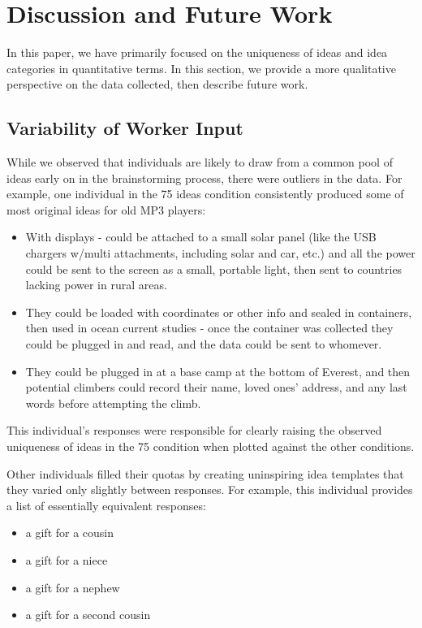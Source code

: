 \section{Discussion and Future Work}

In this paper, we have primarily focused on the uniqueness of ideas and idea categories in quantitative terms. In this section, we provide a more qualitative perspective on the data collected, then describe future work.

\subsection{Variability of Worker Input}
While we observed that individuals are likely to draw from a common pool of ideas early on in the brainstorming process, there were outliers in the data. For example, one individual in the 75 ideas condition consistently produced some of most original ideas for old MP3 players:

\begin{itemize}
\item With displays - could be attached to a small solar panel (like the USB chargers w/multi attachments, including solar and car, etc.) and all the power could be sent to the screen as a small, portable light, then sent to countries lacking power in rural areas.
\item They could be loaded with coordinates or other info and sealed in containers, then used in ocean current studies - once the container was collected they could be plugged in and read, and the data could be sent to whomever.
\item They could be plugged in at a base camp at the bottom of Everest, and then potential climbers could record their name, loved ones' address, and any last words before attempting the climb. 
\end{itemize}

This individual's responses were responsible for clearly raising the observed uniqueness of ideas in the 75 condition when plotted against the other conditions.

Other individuals filled their quotas by creating uninspiring idea templates that they varied only slightly between responses. For example, this individual provides a list of essentially equivalent responses:

\begin{itemize}
\item a gift for a cousin
\item a gift for a niece
\item a gift for a nephew
\item a gift for a second cousin
\end{itemize}


